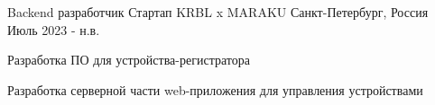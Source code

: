 

\begin{cventries}

  \cventry
    {Backend разработчик} %
    {Стартап KRBL x MARAKU} %
    {Санкт-Петербург, Россия} %
    {Июль 2023 - н.в.} %
    {
      \begin{cvitems} %
        \item {Разработка ПО для устройства-регистратора}
        \item {Разработка серверной части web-приложения для управления устройствами}
      \end{cvitems}
    }

\end{cventries}
